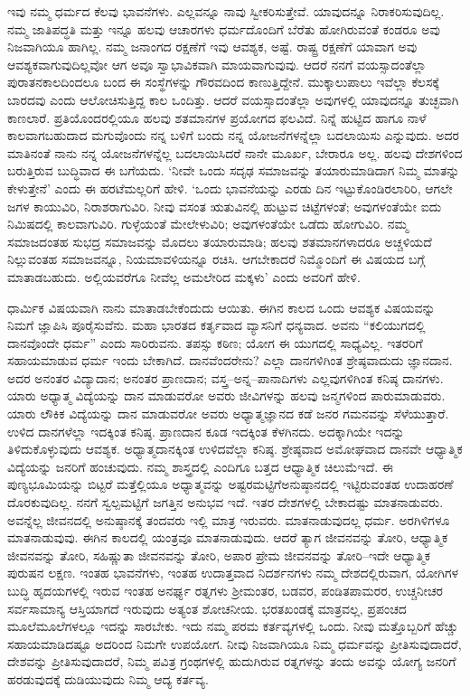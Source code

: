 ಇವು ನಮ್ಮ ಧರ್ಮದ ಕೆಲವು ಭಾವನೆಗಳು. ಎಲ್ಲವನ್ನೂ ನಾವು ಸ್ವೀಕರಿಸುತ್ತೇವೆ. ಯಾವುದನ್ನೂ ನಿರಾಕರಿಸುವುದಿಲ್ಲ. ನಮ್ಮ ಜಾತಿಪದ್ಧತಿ ಮತ್ತು ಇನ್ನೂ ಹಲವು ಆಚಾರಗಳು ಧರ್ಮದೊಂದಿಗೆ ಬೆರೆತು ಹೋಗಿರುವಂತೆ ಕಂಡರೂ ಅವು ನಿಜವಾಗಿಯೂ ಹಾಗಿಲ್ಲ. ನಮ್ಮ ಜನಾಂಗದ ರಕ್ಷಣೆಗೆ ಇವು ಆವಶ್ಯಕ, ಅಷ್ಟೆ. ರಾಷ್ಟ್ರ ರಕ್ಷಣೆಗೆ ಯಾವಾಗ ಅವು ಆವಶ್ಯಕವಾಗುವುದಿಲ್ಲವೋ ಆಗ ಅವೂ ಸ್ವಾಭಾವಿಕವಾಗಿ ಮಾಯವಾಗುವುವು. ಆದರೆ ನನಗೆ ವಯಸ್ಸಾದಂತೆಲ್ಲಾ ಪುರಾತನಕಾಲದಿಂದಲೂ ಬಂದ ಈ ಸಂಸ್ಥೆಗಳನ್ನು ಗೌರವದಿಂದ ಕಾಣುತ್ತಿದ್ದೇನೆ. ಮುಕ್ಕಾಲುಪಾಲು ಇವೆಲ್ಲಾ ಕೆಲಸಕ್ಕೆ ಬಾರದವು ಎಂದು ಆಲೋಚಿಸುತ್ತಿದ್ದ ಕಾಲ ಒಂದಿತ್ತು. ಆದರೆ ವಯಸ್ಸಾದಂತೆಲ್ಲಾ ಅವುಗಳಲ್ಲಿ ಯಾವುದನ್ನೂ ತುಚ್ಛವಾಗಿ ಕಾಣಲಾರೆ. ಪ್ರತಿಯೊಂದರಲ್ಲಿಯೂ ಹಲವು ಶತಮಾನಗಳ ಪ್ರಯೋಗದ ಫಲವಿದೆ. ನಿನ್ನೆ ಹುಟ್ಟಿದ ಹಾಗೂ ನಾಳೆ ಕಾಲವಾಗಬಹುದಾದ ಮಗುವೊಂದು ನನ್ನ ಬಳಿಗೆ ಬಂದು ನನ್ನ ಯೋಜನೆಗಳನ್ನೆಲ್ಲಾ ಬದಲಾಯಿಸು ಎನ್ನುವುದು. ಅದರ ಮಾತಿನಂತೆ ನಾನು ನನ್ನ ಯೋಜನೆಗಳನ್ನೆಲ್ಲ ಬದಲಾಯಿಸಿದರೆ ನಾನೇ ಮೂರ್ಖ, ಬೇರಾರೂ ಅಲ್ಲ. ಹಲವು ದೇಶಗಳಿಂದ ಬರುತ್ತಿರುವ ಬುದ್ಧಿವಾದ ಈ ಬಗೆಯದು. ‘ನೀವೇ ಒಂದು ಸದೃಢ ಸಮಾಜವನ್ನು ತಯಾರುಮಾಡಿದಾಗ ನಿಮ್ಮ ಮಾತನ್ನು ಕೇಳುತ್ತೇನೆ’ ಎಂದು ಈ ಹರಟೆಮಲ್ಲರಿಗೆ ಹೇಳಿ. ‘ಒಂದು ಭಾವನೆಯನ್ನು ಎರಡು ದಿನ ಇಟ್ಟುಕೊಂಡಿರಲಾರಿರಿ, ಆಗಲೇ ಜಗಳ ಕಾಯುವಿರಿ, ನಿರಾಶರಾಗುವಿರಿ. ನೀವು ವಸಂತ ಋತುವಿನಲ್ಲಿ ಹುಟ್ಟುವ ಚಿಟ್ಟೆಗಳಂತೆ; ಅವುಗಳಂತೆಯೇ ಐದು ನಿಮಿಷದಲ್ಲಿ ಕಾಲವಾಗುವಿರಿ. ಗುಳ್ಳೆಯಂತೆ ಮೇಲೇಳುವಿರಿ; ಅವುಗಳಂತೆಯೇ ಒಡೆದು ಹೋಗುವಿರಿ. ನಮ್ಮ ಸಮಾಜದಂತಹ ಸುಭದ್ರ ಸಮಾಜವನ್ನು ಮೊದಲು ತಯಾರುಮಾಡಿ; ಹಲವು ಶತಮಾನಗಳಾದರೂ ಅಚ್ಚಳಿಯದೆ ನಿಲ್ಲುವಂತಹ ಸಮಾಜವನ್ನೂ, ನಿಯಮಾವಳಿಯನ್ನೂ ರಚಿಸಿ. ಆಗಬೇಕಾದರೆ ನಿಮ್ಮೊಂದಿಗೆ ಈ ವಿಷಯದ ಬಗ್ಗೆ ಮಾತಾಡಬಹುದು. ಅಲ್ಲಿಯವರೆಗೂ ನೀವೆಲ್ಲ ಅಮಲೇರಿದ ಮಕ್ಕಳು’ ಎಂದು ಅವರಿಗೆ ಹೇಳಿ.

ಧಾರ್ಮಿಕ ವಿಷಯವಾಗಿ ನಾನು ಮಾತಾಡಬೇಕೆಂದುದು ಆಯಿತು. ಈಗಿನ ಕಾಲದ ಒಂದು ಆವಶ್ಯಕ ವಿಷಯವನ್ನು ನಿಮಗೆ ಜ್ಞಾಪಿಸಿ ಪೂರೈಸುವೆನು. ಮಹಾ ಭಾರತದ ಕರ್ತೃ\break ವಾದ ವ್ಯಾಸನಿಗೆ ಧನ್ಯವಾದ. ಅವನು “ಕಲಿಯುಗದಲ್ಲಿ ದಾನವೊಂದೇ ಧರ್ಮ” ಎಂದು ಸಾರಿರುವನು. ತಪಸ್ಸು ಕಠಿಣ; ಯೋಗ ಈ ಯುಗದಲ್ಲಿ ಸಾಧ್ಯವಿಲ್ಲ. ಇತರರಿಗೆ ಸಹಾಯಮಾಡುವ ಧರ್ಮ ಇಂದು ಬೇಕಾಗಿದೆ. ದಾನವೆಂದರೇನು? ಎಲ್ಲಾ ದಾನಗಳಿಗಿಂತ ಶ್ರೇಷ್ಠವಾದುದು ಜ್ಞಾನದಾನ. ಅದರ ಅನಂತರ ವಿದ್ಯಾದಾನ; ಅನಂತರ ಪ್ರಾಣದಾನ; ವಸ್ತ್ರ–ಅನ್ನ–ಪಾನಾದಿಗಳು ಎಲ್ಲವುಗಳಿಗಿಂತ ಕನಿಷ್ಠ ದಾನಗಳು. ಯಾರು ಅಧ್ಯಾತ್ಮ ವಿದ್ಯೆಯನ್ನು ದಾನ ಮಾಡುವರೋ ಅವರು ಜೀವಿಗಳನ್ನು ಹಲವು ಜನ್ಮಗಳಿಂದ ಪಾರುಮಾಡುವರು. ಯಾರು ಲೌಕಿಕ ವಿದ್ಯೆಯನ್ನು ದಾನ ಮಾಡುವರೋ ಅವರು ಅಧ್ಯಾತ್ಮಜ್ಞಾನದ ಕಡೆ ಜನರ ಗಮನವನ್ನು ಸೆಳೆಯುತ್ತಾರೆ. ಉಳಿದ ದಾನಗಳೆಲ್ಲಾ ಇದಕ್ಕಿಂತ ಕನಿಷ್ಠ. ಪ್ರಾಣದಾನ ಕೂಡ ಇದಕ್ಕಿಂತ ಕೆಳಗಿನದು. ಅದಕ್ಕಾಗಿಯೇ ಇದನ್ನು ತಿಳಿದುಕೊಳ್ಳುವುದು ಆವಶ್ಯಕ. ಅಧ್ಯಾತ್ಮದಾನಕ್ಕಿಂತ ಉಳಿದವೆಲ್ಲಾ ಕನಿಷ್ಠ. ಶ್ರೇಷ್ಠವಾದ ಅಮೋಘವಾದ ದಾನವೇ ಆಧ್ಯಾತ್ಮಿಕ ವಿದ್ಯೆಯನ್ನು ಜನರಿಗೆ ಹಂಚುವುದು. ನಮ್ಮ ಶಾಸ್ತ್ರದಲ್ಲಿ ಎಂದಿಗೂ ಬತ್ತದ ಆಧ್ಯಾತ್ಮಿಕ ಚಿಲುಮೆ\break ಇದೆ. ಈ ಪುಣ್ಯಭೂಮಿಯನ್ನು ಬಿಟ್ಟರೆ ಮತ್ತೆಲ್ಲಿಯೂ ಅಧ್ಯಾತ್ಮವನ್ನು ಅಷ್ಟರಮಟ್ಟಿಗೆ\break ಅನುಷ್ಠಾನದಲ್ಲಿ ಇಟ್ಟಿರುವಂತಹ ಉದಾಹರಣೆ ದೊರಕುವುದಿಲ್ಲ. ನನಗೆ ಸ್ವಲ್ಪಮಟ್ಟಿಗೆ ಜಗತ್ತಿನ ಅನುಭವ ಇದೆ. ಇತರ ದೇಶಗಳಲ್ಲಿ ಬೇಕಾದಷ್ಟು ಮಾತನಾಡುವರು. ಅವನ್ನೆಲ್ಲ ಜೀವನದಲ್ಲಿ ಅನುಷ್ಠಾನಕ್ಕೆ ತಂದವರು ಇಲ್ಲಿ ಮಾತ್ರ ಇರುವರು. ಮಾತನಾಡುವುದಲ್ಲ ಧರ್ಮ. ಅರಗಿಳಿಗಳೂ ಮಾತನಾಡುವುವು. ಈಗಿನ ಕಾಲದಲ್ಲಿ ಯಂತ್ರವೂ ಮಾತನಾಡುವುದು. ಆದರೆ ತ್ಯಾಗ ಜೀವನವನ್ನು ತೋರಿ, ಆಧ್ಯಾತ್ಮಿಕ ಜೀವನವನ್ನು ತೋರಿ, ಸಹಿಷ್ಣುತಾ ಜೀವನವನ್ನು ತೋರಿ, ಅಪಾರ ಪ್ರೇಮ ಜೀವನವನ್ನು ತೋರಿ–ಇದೇ ಆಧ್ಯಾತ್ಮಿಕ ಪುರುಷನ ಲಕ್ಷಣ. ಇಂತಹ ಭಾವನೆಗಳು, ಇಂತಹ ಉದಾತ್ತವಾದ ನಿದರ್ಶನಗಳು ನಮ್ಮ ದೇಶದಲ್ಲಿರುವಾಗ, ಯೋಗಿಗಳ ಬುದ್ಧಿ ಹೃದಯಗಳಲ್ಲಿ ಇರುವ ಇಂತಹ ಅನರ್ಘ್ಯ ರತ್ನಗಳು ಶ‍್ರೀಮಂತರ, ಬಡವರ, ಪಂಡಿತಪಾಮರರ, ಉಚ್ಚನೀಚರ ಸರ್ವಸಾಮಾನ್ಯ ಆಸ್ತಿಯಾಗದೆ ಇರುವುದು ಅತ್ಯಂತ ಶೋಚನೀಯ. ಭರತಖಂಡಕ್ಕೆ ಮಾತ್ರವಲ್ಲ, ಪ್ರಪಂಚದ ಮೂಲೆಮೂಲೆಗಳಲ್ಲೂ ಇದನ್ನು ಸಾರಬೇಕು. ಇದು ನಮ್ಮ ಪರಮ ಕರ್ತವ್ಯಗಳಲ್ಲಿ ಒಂದು. ನೀವು ಮತ್ತೊಬ್ಬರಿಗೆ ಹೆಚ್ಚು ಸಹಾಯಮಾಡಿದಷ್ಟೂ ಅದರಿಂದ ನಿಮಗೇ ಉಪಯೋಗ. ನೀವು ನಿಜವಾಗಿಯೂ ನಿಮ್ಮ ಧರ್ಮವನ್ನು ಪ್ರೀತಿಸುವುದಾದರೆ, ದೇಶವನ್ನು ಪ್ರೀತಿಸುವುದಾದರೆ, ನಿಮ್ಮ ಪವಿತ್ರ ಗ್ರಂಥಗಳಲ್ಲಿ ಹುದುಗಿರುವ ರತ್ನಗಳನ್ನು ತಂದು ಅವನ್ನು ಯೋಗ್ಯ ಜನರಿಗೆ ಹರಡುವುದಕ್ಕೆ ದುಡಿಯುವುದು ನಿಮ್ಮ ಆದ್ಯ ಕರ್ತವ್ಯ.

